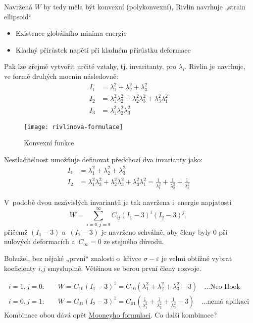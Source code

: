 Navržená $W$ by tedy měla být konvexní (polykonvexní), Rivlin navrhuje „strain ellipsoid“
\begin{itemize}
	\item Existence globálního minima energie
	\item Kladný přírůstek napětí při kladném přírůstku deformace
\end{itemize}

Pak lze zřejmě vytvořit určité vztahy, tj. invaritanty, pro $\lambda_i$.
Rivlin je navrhuje, ve formě druhých mocnin následovně:
\begin{equation}\begin{split}
	I_1 &= \lambda_1^2 + \lambda_2^2 + \lambda_3^2\\
	I_2 &= \lambda_1^2 \lambda_2^2 + \lambda_2^2 \lambda_3^2 + \lambda_3^2 \lambda_1^2\\
	I_3 &= \lambda_1^2 \lambda_2^2 \lambda_3^2
\end{split}\end{equation}

\begin{figure}[H]
	\centering
	\texttt{[image: rivlinova-formulace]}
	\caption{Konvexní funkce}
	\label{fig:rivlinova-formulace}
\end{figure}

Nestlačitelnost umožňuje definovat předchozí dva invarianty jako:
\begin{equation}\begin{split}
	I_1 &= \lambda_1^2 + \lambda_2^2 + \lambda_3^2\\
	I_2 &= \lambda_1^2 \lambda_2^2 + \lambda_2^2 \lambda_3^2 + \lambda_3^2 \lambda_1^2 = \frac{1}{\lambda_1^2} + \frac{1}{\lambda_2^2} + \frac{1}{\lambda_3^2}
\end{split}\end{equation}

V~podobě dvou nezávislých invariantů je tak navržena i~energie napjatosti
\begin{equation}
	W = \sum\limits_{i=0, j=0}^{\infty} C_{ij} (I_1-3)^i (I_2-3)^j,
\end{equation}
přičemž $(I_1-3)$ a~$(I_2-3)$ je navrženo schválně, aby členy byly $0$ při nulových deformacích a~$C_{\infty}=0$ ze stejného důvodu.

Bohužel, bez nějaké „první“ znalosti o~křivce $\sigma-\varepsilon$ je velmi obtížné vybrat koeficienty $i$,$j$ smysluplně. Většinou se berou první členy rozvoje.

\begin{equation}\begin{split}
	i=1, j=0: \quad &W = C_{10} (I_1-3)^1 = C_{10} \left(\lambda_1^2 + \lambda_2^2 + \lambda_3^2 - 3\right) \quad \text{\ldots Neo-Hook}\\
	i=0, j=1: \quad &W = C_{01} (I_2-3)^1 = C_{01} \left(\frac{1}{\lambda_1^2} + \frac{1}{\lambda_2^2} + \frac{1}{\lambda_3^2} - 3\right) \quad \text{\ldots nemá aplikaci}
\end{split}\end{equation}
Kombinace obou dává opět \hyperref[subsec:mooneyho-formulace]{Mooneyho formulaci}. Co další kombinace?
